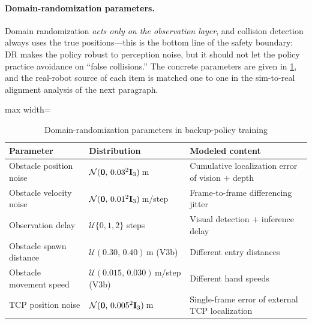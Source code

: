 \paragraph{Domain-randomization parameters.} Domain randomization \emph{acts only on the observation layer}, and collision detection always uses the true positions---this is the bottom line of the safety boundary: DR makes the policy robust to perception noise, but it should not let the policy practice avoidance on ``false collisions.'' The concrete parameters are given in \cref{tab:backup_dr}, and the real-robot source of each item is matched one to one in the sim-to-real alignment analysis of the next paragraph.

\begin{table}[htbp]
  \centering
  \caption{Domain-randomization parameters in backup-policy training}
  \label{tab:backup_dr}
  \footnotesize
  \begin{adjustbox}{max width=\textwidth}
  \begin{tabular}{@{}lll@{}}
    \toprule
    Parameter & Distribution & Modeled content \\
    \midrule
    Obstacle position noise & $\mathcal{N}(\bm{0},\,0.03^2 \mathbf{I}_3)$\,m & Cumulative localization error of vision $+$ depth \\
    Obstacle velocity noise & $\mathcal{N}(\bm{0},\,0.01^2 \mathbf{I}_3)$\,m/step & Frame-to-frame differencing jitter \\
    Observation delay & $\mathcal{U}\{0, 1, 2\}$ steps & Visual detection $+$ inference delay \\
    Obstacle spawn distance & $\mathcal{U}(0.30,\, 0.40)$\,m (V3b) & Different entry distances \\
    Obstacle movement speed & $\mathcal{U}(0.015,\, 0.030)$\,m/step (V3b) & Different hand speeds \\
    TCP position noise & $\mathcal{N}(\bm{0},\,0.005^2 \mathbf{I}_3)$\,m & Single-frame error of external TCP localization \\
    \bottomrule
  \end{tabular}
  \end{adjustbox}
\end{table}


